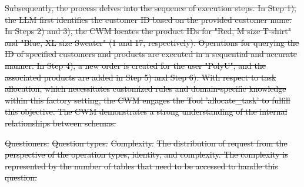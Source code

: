 \documentclass[preprint,12pt]{elsarticle}
\providecommand{\DIFdeltex}[1]{{\protect\color{red}\sout{#1}}}                      %
\providecommand{\DIFdelFL}[1]{\DIFdel{#1}} %
\providecommand{\DIFdel}[1]{\texorpdfstring{\DIFdeltex{#1}}{}} %
\begin{document}
\DIFdel{Subsequently, the process delves into the sequence of execution steps.
In Step 1), the LLM first identifies the customer ID based on the provided customer name. 
In Steps 2) and 3), the CWM locates the product IDs for "Red, M size T-shirt" and "Blue, XL size Sweater" (1 and 17, respectively). 
Operations for querying the ID of specified customers and products are executed in a sequential and accurate manner.
In Step 4), a new order is created for the user "PolyU", and the associated products are added in Step 5) and Step 6). 
With respect to task allocation, which necessitates customized rules and domain-specific knowledge within this factory setting, the CWM engages the Tool 'allocate\_task' to fulfill this objective.
The CWM demonstrates a strong understanding of the internal relationships between schemas.
}%



{%
\DIFdelFL{Questioners.}}
{%
\DIFdelFL{Question types.}}
{%
\DIFdelFL{Complexity.}}
{%
\DIFdelFL{The distribution of request from the perspective of the operation types, identity, and complexity. The complexity is represented by the number of tables that need to be accessed to handle this question.}}
\end{document}
